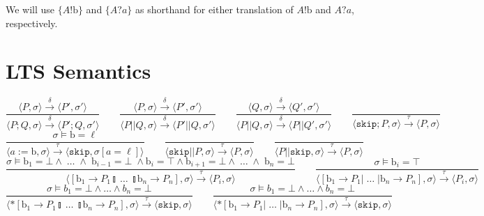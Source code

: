 \documentclass{article}
\begin{document}
We will use $\{A!\mathrm{b}\}$ and $\{A?a\}$ as shorthand for either translation of $A!\mathrm{b}$ and $A?a$, respectively.

\section{LTS Semantics}
$$
    \frac{\langle P, \sigma \rangle \xrightarrow{\delta} \langle P', \sigma' \rangle}{\langle P ; Q, \sigma \rangle \xrightarrow{\delta} \langle P' ; Q, \sigma' \rangle} \qquad
    \frac{\langle P, \sigma \rangle \xrightarrow{\delta} \langle P', \sigma' \rangle}{\langle P || Q, \sigma \rangle \xrightarrow{\delta} \langle P' || Q, \sigma' \rangle} \qquad
    \frac{\langle Q, \sigma \rangle \xrightarrow{\delta} \langle Q', \sigma' \rangle}{\langle P || Q, \sigma \rangle \xrightarrow{\delta} \langle P || Q', \sigma' \rangle} \qquad
    \frac{}{\langle \mathtt{skip}; P, \sigma \rangle \xrightarrow{\tau} \langle P, \sigma \rangle} $$$$
    \frac{\sigma \models \mathrm{b} = \ell}{\langle a := \mathrm{b}, \sigma \rangle \xrightarrow{\tau} \langle \mathtt{skip}, \sigma[a = \ell] \rangle} \qquad
    \frac{}{\langle \mathtt{skip} || P, \sigma \rangle \xrightarrow{\tau} \langle P, \sigma \rangle} \qquad
    \frac{}{\langle P || \mathtt{skip}, \sigma \rangle \xrightarrow{\tau} \langle P, \sigma \rangle} $$$$
    \frac{\sigma \models \mathrm{b}_1 = \bot \wedge \; \ldots \; \wedge \; \mathrm{b}_{i-1} = \bot \; \wedge \mathrm{b}_i = \top \wedge \mathrm{b}_{i+1} = \bot \wedge \; \ldots \; \wedge \; \mathrm{b}_n = \bot} {\langle [ \mathrm{b}_1 \rightarrow P_1  \talloblong \; \ldots \; \talloblong \mathrm{b}_n \rightarrow P_n ] , \sigma \rangle \xrightarrow{\tau} \langle P_i , \sigma\rangle  } \qquad
    \frac{\sigma \models \mathrm{b}_i = \top} {\langle [ \mathrm{b}_1 \rightarrow P_1  | \; \ldots \; | \mathrm{b}_n \rightarrow P_n ] , \sigma \rangle \xrightarrow{\tau} \langle P_i , \sigma\rangle  } $$$$
    \frac{\sigma \models b_1 = \bot \wedge \ldots \wedge b_n = \bot}{\langle *[ \mathrm{b}_1 \rightarrow P_1  \talloblong \; \ldots \; \talloblong \mathrm{b}_n \rightarrow P_n ] , \sigma \rangle \xrightarrow{\tau} \langle \mathtt{skip} , \sigma\rangle } \qquad
    \frac{\sigma \models b_1 = \bot \wedge \ldots \wedge b_n = \bot}{\langle *[ \mathrm{b}_1 \rightarrow P_1  | \; \ldots \; | \mathrm{b}_n \rightarrow P_n ] , \sigma \rangle \xrightarrow{\tau} \langle \mathtt{skip} , \sigma \rangle } $$$$
$$
\end{document}
